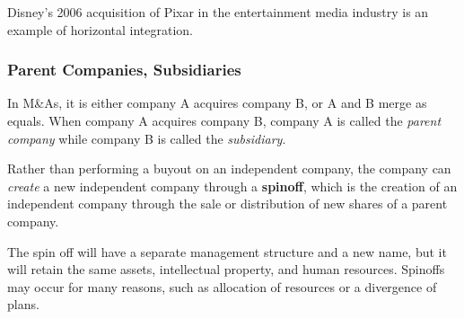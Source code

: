 \documentclass{article}
\begin{document}
      \begin{example}
        Disney's 2006 acquisition of Pixar in the entertainment media industry is an example of horizontal integration. 
      \end{example}

    \subsubsection{Parent Companies, Subsidiaries}

      In M\&As, it is either company A acquires company B, or A and B merge as equals. When company A acquires company B, company A is called the \textit{parent company} while company B is called the \textit{subsidiary}. 

      \begin{definition}[Spinoff]
        Rather than performing a buyout on an independent company, the company can \textit{create} a new independent company through a \textbf{spinoff}, which is the creation of an independent company through the sale or distribution of new shares of a parent company. 

        The spin off will have a separate management structure and a new name, but it will retain the same assets, intellectual property, and human resources. Spinoffs may occur for many reasons, such as allocation of resources or a divergence of plans. 
      \end{definition}
\end{document}
